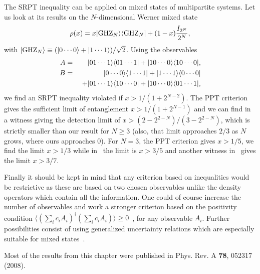 The SRPT inequality can be applied on mixed states of multipartite systems. Let us look at its results on the $N$-dimensional Werner mixed state
\[ \rho(x)= x | \mbox{GHZ}_N \rangle \langle \mbox{GHZ}_N | +(1-x)\frac{I_{2^N}}{2^N},\]
with $| \mbox{GHZ}_N \rangle \equiv (| 0\cdots0 \rangle+| 1\cdots1 \rangle)/\sqrt 2$.  Using the observables
\begin{eqnarray}
  A&=&| 01\cdots 1 \rangle \langle 01\cdots1 |+| 10\cdots 0 \rangle \langle 10\cdots 0 |,\\
  B&=&| 0\cdots 0 \rangle \langle 1\cdots1 |+| 1\cdots 1 \rangle \langle 0\cdots 0 | \nonumber \\
  && \ +| 01\cdots 1 \rangle \langle 10\cdots0 |+| 10\cdots 0 \rangle \langle 01\cdots 1 |,
\end{eqnarray}
we find an SRPT inequality violated if $x> 1/(1+2^{N-2})$. The PPT criterion gives the sufficient limit of entanglement $x> 1/(1+2^{N-1})$ and we can find in~\cite{Tot05} a witness giving the detection limit  of $x>(2-2^{2-N})/(3-2^{2-N})$, which is strictly smaller than our result for $N \geq 3$ (also, that limit approaches $2/3$ as $N$ grows, where ours approaches 0). For $N=3$, the PPT criterion gives $x>1/5$, we find the limit $x>1/3$ while in~\cite{Tot05} the limit is $x>3/5$ and another witness in~\cite{Guh04} gives the limit $x>3/7$.

Finally it should be kept in mind that any criterion based on inequalities would be restrictive as these are based on two chosen observables unlike the density operators which contain all the information. One could of course increase the number of observables and work a stronger criterion  based on the positivity condition $\langle \left( \sum_i c_i A_{i} \right)^\dagger \left(\sum_i c_i A_{i} \right)  \rangle \ge 0$~\cite{Ush07},
for any observable $A_{i}$. Further possibilities consist of using generalized uncertainty relations which are especially suitable for mixed states~\cite{Aga03}.

Most of the results from this chapter were published in Phys. Rev. A \textbf{78}, 052317 (2008).
